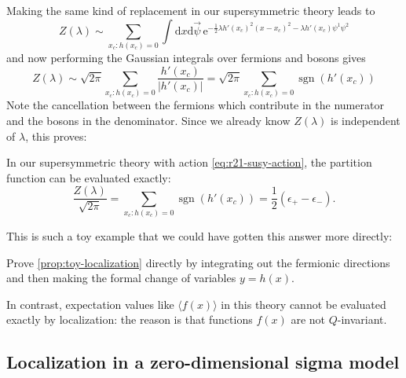 \documentclass[12pt,letterpaper,reqno]{article}
\numberwithin{equation}{section}
\newcommand{\half}{\ensuremath{\frac{1}{2}}}
\newcommand{\e}{{\mathrm e}}
\newcommand{\de}{\mathrm{d}}
\newcommand{\abs}[1]{\lvert#1\rvert}
\newcommand{\IP}[1]{\langle#1\rangle}
\newcommand{\eps}{\epsilon}
\DeclareMathOperator{\sgn}{sgn}
\newcommand{\insfig}[2]{

\medskip
\noindent
\begin{minipage}{\linewidth}
\makebox[\linewidth]{\texttt{[image: figures/\#1-crop.pdf]}}
\end{minipage}
\noindent}
\newcommand{\fixme}[1]{{\color{orange}{[#1]}}}
\begin{document}
Making the same kind of replacement in our supersymmetric theory leads to
\begin{equation}
  Z(\lambda) \sim \sum_{x_c: h(x_c) = 0} \int \de x \de \vec\psi \, \e^{- \half \lambda h'(x_c)^2 (x-x_c)^2 - \lambda h'(x_c) \psi^1 \psi^2}
\end{equation}
and now performing the Gaussian integrals over fermions and bosons gives
\begin{equation}
  Z(\lambda) \sim \sqrt{2 \pi} \sum_{x_c: h(x_c) = 0} \frac{h'(x_c)}{\abs{h'(x_c)}} = \sqrt{2 \pi} \sum_{x_c: h(x_c) = 0} \sgn(h'(x_c))
\end{equation}
Note the cancellation between the fermions which contribute 
in the numerator and the bosons in the denominator.
Since we already know 
$Z(\lambda)$ is independent of $\lambda$, this proves:
\begin{prop} \label{prop:toy-localization}
In our supersymmetric theory with action \eqref{eq:r21-susy-action},
the partition function can be evaluated exactly:
\begin{equation}
  \frac{Z(\lambda)}{\sqrt{2\pi}} = \sum_{x_c: h(x_c) = 0} \sgn(h'(x_c)) = \half (\eps_+ - \eps_-).
\end{equation}
\end{prop}
\insfig{qft-geometry-15}{0.8}
This is such a toy example that we could have gotten this answer more directly:
\begin{exercise}
Prove \autoref{prop:toy-localization} directly by integrating
out the fermionic directions and then making the formal change of variables
$y = h(x)$.
\end{exercise}

\fixme{study the cancellation in perturbation theory?}

In contrast, expectation values like $\IP{f(x)}$ 
in this theory cannot be evaluated
exactly by localization: the reason is that
functions $f(x)$ are not
$Q$-invariant.


\subsection{Localization in a zero-dimensional sigma model} \label{sec:0d-sigma-model-localization}
\end{document}
